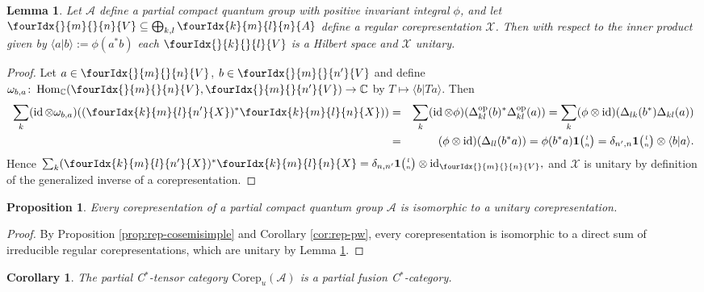 \documentclass[10pt]{article}
\DeclareMathOperator{\id}{id}
\DeclareMathOperator{\Hom}{Hom}
\DeclareMathOperator{\op}{\mathrm{op}}
\newcommand{\Corep}{\mathrm{Corep}}
\newcommand{\C}{\mathbb{C}}
\newcommand{\Grt}[3]{#1{\tiny {\begin{pmatrix} #2\\#3\end{pmatrix}}}}
\newcommand{\UnitC}[2]{\Grt{\mathbf{1}}{#1}{#2}}
\newcommand{\Gr}[5]{\fourIdx{#2}{#4}{#3}{#5}{#1}}%
\newcommand{\Gru}[3]{\Gr{#1}{}{}{#2}{#3}}
\newtheorem{Lem}[Theorem]{Lemma}
\newtheorem{Prop}[Theorem]{Proposition}
\newtheorem{Cor}[Theorem]{Corollary}
\theoremstyle{definition}
\numberwithin{equation}{section}
\begin{document}
\begin{Lem} \label{lemma:rep-regular-unitary}
  Let $\mathscr{A}$ define a partial compact quantum group with
positive invariant  integral $\phi$, and let $\Gru{V}{m}{n} \subseteq
\bigoplus_{k,l} \Gr{A}{k}{l}{m}{n}$ define a regular corepresentation $\mathscr{X}$. Then with
    respect to the inner product given by $\langle
    a|b\rangle:=\phi(a^{*}b)$ each $\Gru{V}{k}{l}$ is a Hilbert space and $\mathscr{X}$ unitary.
\end{Lem}
\begin{proof}   Let  $a\in \Gru{V}{m}{n}$, $b\in \Gru{V}{m}{n'}$ and define $\omega_{b,a} \colon
\Hom_{\C}(\Gru{V}{m}{n},\Gru{V}{m}{n'}) \to \C$ by $T
\mapsto \langle b|Ta\rangle$. Then
\begin{eqnarray*}
\sum_{k }(\id \otimes \omega_{b,a})
((\Gr{X}{k}{l}{m}{n'})^* \Gr{X}{k}{l}{m}{n}))  &=& \sum_k
(\id\otimes \phi)(\Delta_{kl}^{\op}(b)^*\Delta_{kl}^{\op}(a))
  = \sum_k (\phi\otimes
  \id)(\Delta_{lk}(b^*)\Delta_{kl}(a)) \\ &=& (\phi\otimes
  \id)(\Delta_{ll}(b^*a))  = \phi(b^*a)\UnitC{l}{n} =
  \delta_{n',n} \UnitC{l}{n} \otimes \langle b|a\rangle.
\end{eqnarray*} Hence $ \sum_{k}
    (\Gr{X}{k}{l}{m}{n'})^* \Gr{X}{k}{l}{m}{n} =
    \delta_{n,n'}\UnitC{l}{n}\otimes
    \id_{\Gru{V}{m}{n}},$ and $\mathscr{X}$ is unitary by definition of the generalized inverse of a corepresentation.
\end{proof} 

\begin{Prop} \label{prop:rep-unitarisable} Every 
  corepresentation of a partial compact quantum group $\mathscr{A}$ is
  isomorphic to a unitary corepresentation.
\end{Prop}
\begin{proof}
  By Proposition \ref{prop:rep-cosemisimple} and Corollary
  \ref{cor:rep-pw}, every corepresentation is isomorphic to a direct
  sum of irreducible regular corepresentations, which are unitary by
  Lemma \ref{lemma:rep-regular-unitary}.
\end{proof}
\begin{Cor} The partial C$^*$-tensor category $\Corep_u(\mathscr{A})$ is a partial fusion C$^{*}$-category.
\end{Cor}
\end{document}
